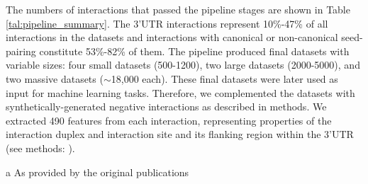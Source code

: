 \documentclass{bmcart}
\begin{document}
The numbers of interactions that passed the pipeline stages are shown in Table \ref{tal:pipeline_summary}. The 3'UTR interactions represent 10\%-47\% of all interactions in the datasets and interactions with canonical or non-canonical seed-pairing constitute 53\%-82\% of them. The pipeline produced final datasets with variable sizes: four small datasets (500-1200), two large datasets (2000-5000), and two massive datasets ($\sim$18,000 each). These final datasets were later used as input for machine learning tasks. Therefore, we complemented the datasets with synthetically-generated negative interactions as described in methods. We extracted 490 features from each interaction, representing properties of the interaction duplex and interaction site and its flanking region within the 3'UTR (see methods: ).


\begin{table}[h!]
\caption{Summary of the data processing pipeline}
      \label{tal:pipeline_summary}
                 \begin{threeparttable}
\begin{tablenotes}
            \item[a] As provided by the original publications
        \end{tablenotes}
     \end{threeparttable}
\end{table}
\end{document}
